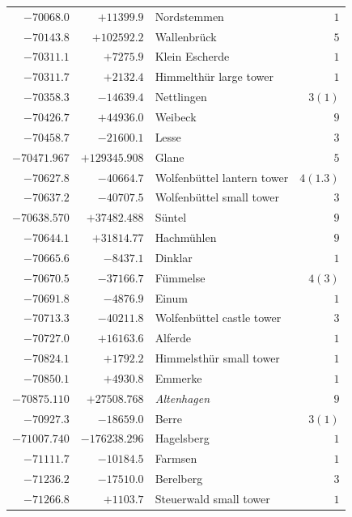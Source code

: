 \begin{center}
\begin{tabular}{r|r|p{170pt}|r}
\(-70068.0\)&\(+11399.9\)&Nordstemmen&\(1\)\\
\(-70143.8\)&\(+102592.2\)&Wallenbrück&\(5\)\\
\(-70311.1\)&\(+7275.9\)&Klein Escherde&\(1\)\\
\(-70311.7\)&\(+2132.4\)&Himmelthür large tower&\(1\)\\
\(-70358.3\)&\(-14639.4\)&Nettlingen&\(3 (1)\)\\
\(-70426.7\)&\(+44936.0\)&Weibeck&\(9\)\\
\(-70458.7\)&\(-21600.1\)&Lesse&\(3\)\\
\(-70471.967\)&\(+129345.908\)&Glane&\(5\)\\
\(-70627.8\)&\(-40664.7\)&Wolfenbüttel lantern tower&\(4(1.3)\)\\
\(-70637.2\)&\(-40707.5\)&Wolfenbüttel small tower&\(3\)\\
\(-70638.570\)&\(+37482.488\)&Süntel&\(9\)\\
\(-70644.1\)&\(+31814.77\)&Hachmühlen&\(9\)\\
\(-70665.6\)&\(-8437.1\)&Dinklar&\(1\)\\
\(-70670.5\)&\(-37166.7\)&Fümmelse&\(4 (3)\)\\
\(-70691.8\)&\(-4876.9\)&Einum&\(1\)\\
\(-70713.3\)&\(-40211.8\)&Wolfenbüttel castle tower&\(3\)\\
\(-70727.0\)&\(+16163.6\)&Alferde&\(1\)\\
\(-70824.1\)&\(+1792.2\)&Himmelsthür small tower&\(1\)\\
\(-70850.1\)&\(+4930.8\)&Emmerke&\(1\)\\
\(-70875.110\)&\(+27508.768\)&\textit{Altenhagen}&\(9\)\\
\(-70927.3\)&\(-18659.0\)&Berre&\(3 (1)\)\\
\(-71007.740\)&\(-176238.296\)&Hagelsberg&\(1\)\\
\(-71111.7\)&\(-10184.5\)&Farmsen&\(1\)\\
\(-71236.2\)&\(-17510.0\)&Berelberg&\(3\)\\
\(-71266.8\)&\(+1103.7\)&Steuerwald small tower&\(1\)\\
\hline\end{tabular}\endgroup\end{center}
\clearpage
